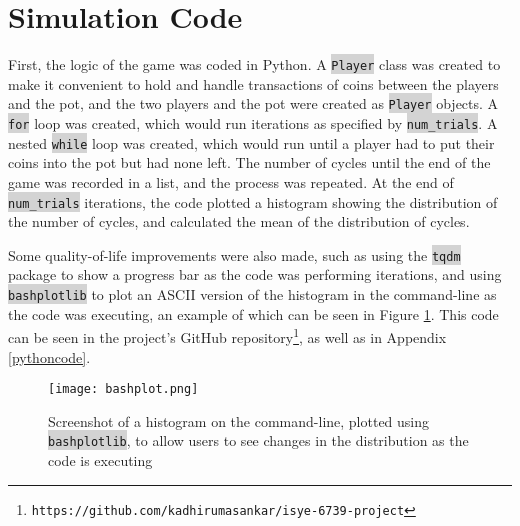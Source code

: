 \newcommand{\code}[1]{\colorbox{lightgray}{\texttt{#1}}}

\section{Simulation Code}
\label{sim}

First, the logic of the game was coded in Python. A \code{Player} class was created to make it convenient to hold and handle transactions of coins between the players and the pot, and the two players and the pot were created as \code{Player} objects. A \code{for} loop was created, which would run iterations as specified by \code{num\_trials}. A nested \code{while} loop was created, which would run until a player had to put their coins into the pot but had none left. The number of cycles until the end of the game was recorded in a list, and the process was repeated. At the end of \code{num\_trials} iterations, the code plotted a histogram showing the distribution of the number of cycles, and calculated the mean of the distribution of cycles.

Some quality-of-life improvements were also made, such as using the \code{tqdm} package to show a progress bar as the code was performing iterations, and using \code{bashplotlib} to plot an ASCII version of the histogram in the command-line as the code was executing, an example of which can be seen in Figure \ref{fig:bashplot}. This code can be seen in the project's GitHub repository\footnote{\texttt{https://github.com/kadhirumasankar/isye-6739-project}}, as well as in Appendix \ref{pythoncode}.

\begin{figure}[H]
\centering
\texttt{[image: bashplot.png]}
\caption{Screenshot of a histogram on the command-line, plotted using \code{bashplotlib}, to allow users to see changes in the distribution as the code is executing}
\label{fig:bashplot}
\end{figure}